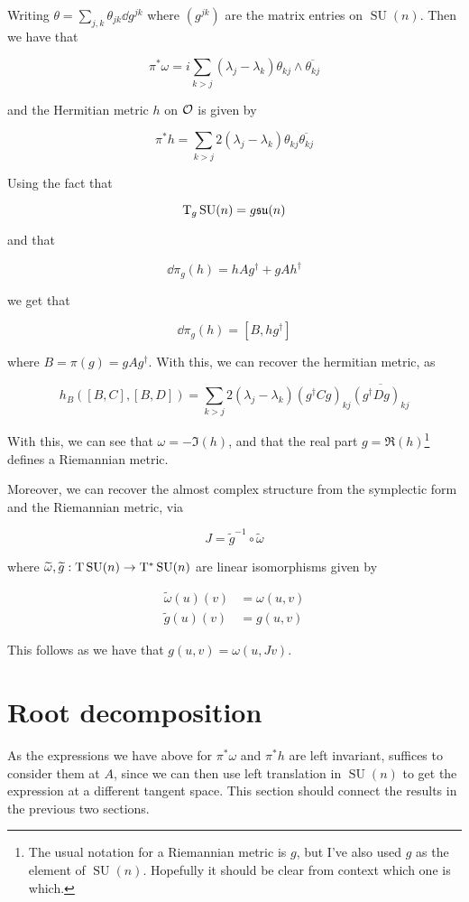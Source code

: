 \documentclass{article}
\DeclareMathOperator{\SU}{SU}
\newcommand{\su}{\mathfrak{su}}
\renewcommand{\tilde}{\widetilde}
\begin{document}
Writing \(\theta = \sum_{j, k}\theta_{jk}\dd g^{jk}\) where \((g^{jk})\) are the matrix entries on \(\SU(n)\). Then we have that

\[\pi^*\omega = i \sum_{k > j}(\lambda_j - \lambda_k)\theta_{kj}\wedge \overline{\theta_{kj}}\]

and the Hermitian metric \(h\) on \(\mathcal{O}\) is given by

\[\pi^*h = \sum_{k > j}2(\lambda_j - \lambda_k)\theta_{kj}\overline{\theta_{kj}}\]

Using the fact that

\[\TT_g\SU(n) = g\su(n)\]

and that

\[\dd\pi_g(h) = hAg^\dagger + gAh^\dagger\]

we get that

\[\dd\pi_g(h) = [B, hg^\dagger]\]

where \(B = \pi(g) = gAg^\dagger\). With this, we can recover the hermitian metric, as

\[h_B([B, C], [B, D]) = \sum_{k > j}2(\lambda_j - \lambda_k)(g^\dagger Cg)_{kj}\overline{(g^\dagger Dg)_{kj}}\]

With this, we can see that \(\omega = -\Im(h)\), and that the real part \(g = \Re(h)\)\footnote{The usual notation for a Riemannian metric is \(g\), but I've also used \(g\) as the element of \(\SU(n)\). Hopefully it should be clear from context which one is which.} defines a Riemannian metric.

Moreover, we can recover the almost complex structure from the symplectic form and the Riemannian metric, via

\[J = \tilde g^{-1} \circ \tilde\omega\]

where \(\tilde\omega, \tilde g : \TT \SU(n) \to \TT^*\SU(n)\) are linear isomorphisms given by

\begin{align*}
    \tilde \omega(u)(v) &= \omega(u, v) \\
    \tilde g(u)(v) &= g(u, v)
\end{align*}

This follows as we have that \(g(u, v) = \omega(u, Jv)\).

\section{Root decomposition}

As the expressions we have above for \(\pi^*\omega\) and \(\pi^*h\) are left invariant, suffices to consider them at \(A\), since we can then use left translation in \(\SU(n)\) to get the expression at a different tangent space. This section should connect the results in the previous two sections.
\end{document}
